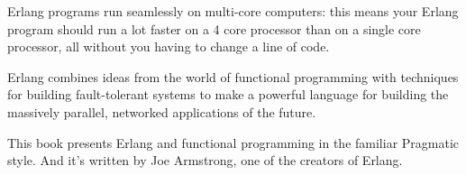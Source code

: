 Erlang programs run seamlessly on multi-core computers: this means your Erlang program should run a lot faster on a 4 core processor than on a single core processor, all without you having to change a line of code.

Erlang combines ideas from the world of functional programming with techniques for building fault-tolerant systems to make a powerful language for building the massively parallel, networked applications of the future.

This book presents Erlang and functional programming in the familiar Pragmatic style. And it's written by Joe Armstrong, one of the creators of Erlang.



